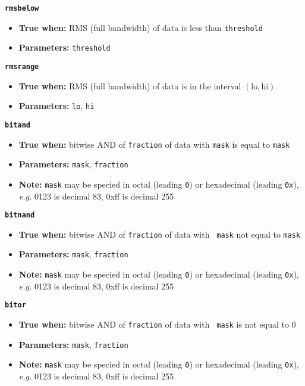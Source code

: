 \documentclass[11pt]{article}
\begin{document}
{\large\texttt{\textbf{rmsbelow}}}

\begin{itemize}
\item \textbf{True when:} RMS (full bandwidth) of data is less than
  \texttt{threshold}
\item \textbf{Parameters:} \texttt{threshold}
\end{itemize}


{\large\texttt{\textbf{rmsrange}}}

\begin{itemize}
\item \textbf{True when:} RMS (full bandwidth) of data is in the interval
  $(\mathrm{lo}, \mathrm{hi})$
\item \textbf{Parameters:} \texttt{lo}, \texttt{hi}
\end{itemize}


{\large\texttt{\textbf{bitand}}}

\begin{itemize}
\item \textbf{True when:} bitwise AND of \texttt{fraction} of data
  with  \texttt{mask} is equal to \texttt{mask}
\item \textbf{Parameters:} \texttt{mask}, \texttt{fraction}
\item \textbf{Note:} \texttt{mask} may be specied in octal (leading
  \texttt{0}) or hexadecimal (leading \texttt{0x}), \textit{e.g.} 0123 is
  decimal 83, 0xff is decimal 255
\end{itemize}

{\large\texttt{\textbf{bitnand}}}

\begin{itemize}
\item \textbf{True when:} bitwise AND of \texttt{fraction} of data with \texttt{
    mask} not equal to \texttt{mask}
\item \textbf{Parameters:} \texttt{mask}, \texttt{fraction}
\item \textbf{Note:} \texttt{mask} may be specied in octal (leading
  \texttt{0})  or hexadecimal (leading \texttt{0x}),
  \textit{e.g.} 0123 is decimal 83, 0xff is decimal 255
\end{itemize}

{\large\texttt{\textbf{bitor}}}

\begin{itemize}
\item \textbf{True when:} bitwise AND of \texttt{fraction} of data with \texttt{
    mask} is not equal to 0
\item \textbf{Parameters:} \texttt{mask}, \texttt{fraction}
\item \textbf{Note:} \texttt{mask} may be specied in octal (leading
  \texttt{0})  or hexadecimal (leading \texttt{0x}),  \textit{e.g.} 0123
  is decimal 83, 0xff is decimal 255   
\end{itemize}
\end{document}
